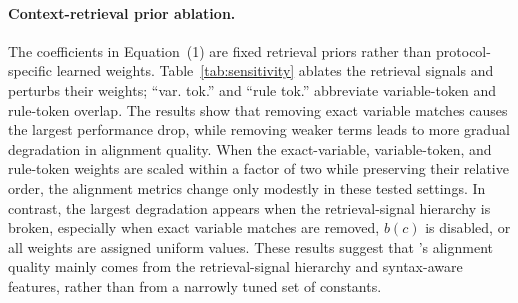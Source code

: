\begin{table}[t]
\centering
\caption{Effectiveness of rule-to-code alignment.}
\label{tab:alignment}
\end{table}

\paragraph{Context-retrieval prior ablation.}
The coefficients in Equation~(1) are fixed retrieval priors rather than
protocol-specific learned weights. Table~\ref{tab:sensitivity} ablates the
retrieval signals and perturbs their weights; ``var. tok.'' and ``rule tok.''
abbreviate variable-token and rule-token overlap. The results show that
removing exact variable matches
causes the largest performance drop, while removing weaker terms leads to more
gradual degradation in alignment quality. When the exact-variable, variable-token,
and rule-token weights are scaled within a factor of two while preserving their
relative order, the alignment metrics change only modestly in these tested
settings. In contrast, the largest
degradation appears when the retrieval-signal hierarchy is broken, especially
when exact variable matches are removed, $b(c)$ is disabled, or all weights are
assigned uniform values. These results suggest that \tool{}'s alignment quality
mainly comes from the retrieval-signal hierarchy and syntax-aware features,
rather than from a narrowly tuned set of constants.


